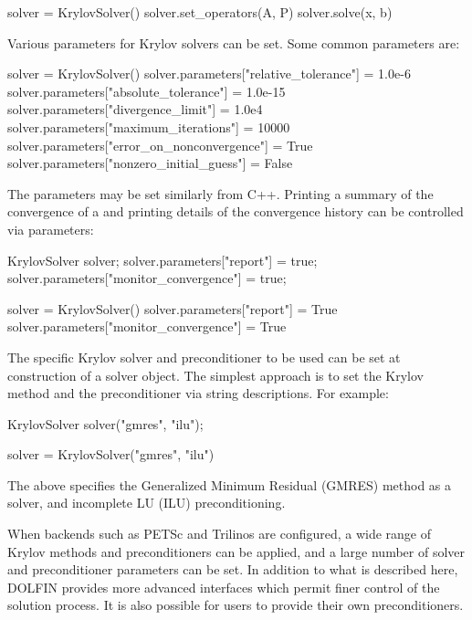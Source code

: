 \begin{python}
solver = KrylovSolver()
solver.set_operators(A, P)
solver.solve(x, b)
\end{python}
Various parameters for Krylov solvers can be set. Some common parameters
are:

\begin{python}
solver = KrylovSolver()
solver.parameters["relative_tolerance"]      = 1.0e-6
solver.parameters["absolute_tolerance"]      = 1.0e-15
solver.parameters["divergence_limit"]        = 1.0e4
solver.parameters["maximum_iterations"]      = 10000
solver.parameters["error_on_nonconvergence"] = True
solver.parameters["nonzero_initial_guess"]   = False
\end{python}
The parameters may be set similarly from C++. Printing a summary of
the convergence of a  and printing details of the
convergence history can be controlled via parameters:

\begin{c++}
KrylovSolver solver;
solver.parameters["report"] = true;
solver.parameters["monitor_convergence"] = true;
\end{c++}

\begin{python}
solver = KrylovSolver()
solver.parameters["report"] = True
solver.parameters["monitor_convergence"] = True
\end{python}
The specific Krylov solver and preconditioner to be used can be set at
construction of a solver object. The simplest approach is to set the
Krylov method and the preconditioner via string descriptions. For example:

\begin{c++}
KrylovSolver solver("gmres", "ilu");
\end{c++}

\begin{python}
solver = KrylovSolver("gmres", "ilu")
\end{python}
The above specifies the Generalized Minimum Residual (GMRES) method as
a solver, and incomplete LU (ILU) preconditioning.

When backends such as PETSc and Trilinos are configured, a wide range
of Krylov methods and preconditioners can be applied, and a large
number of solver and preconditioner parameters can be set. In addition
to what is described here, DOLFIN provides more advanced interfaces
which permit finer control of the solution process. It is also
possible for users to provide their own preconditioners.

